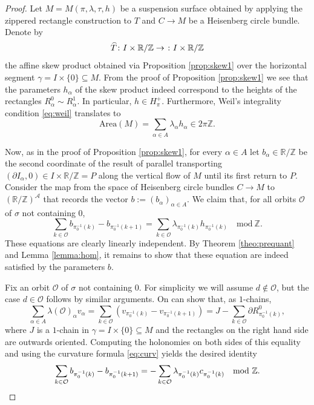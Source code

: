 \documentclass{amsart}
\theoremstyle{definition}
\theoremstyle{remark}
\numberwithin{equation}{section}
\newcommand{\<}{{\langle}}
\renewcommand{\>}{{\rangle}}
\begin{document}
\begin{proof}
    Let $M = M(\pi,\lambda,\tau,h)$ be a suspension surface obtained by applying the zippered rectangle construction to $T$ and $C \to M$ be a Heisenberg circle bundle. Denote by $$\smash{\widehat{T}} \colon I \times \mathbb{R}/\mathbb{Z} \to \mathbb \colon I \times \mathbb{R}/\mathbb{Z}$$ the affine skew product obtained via Proposition \ref{prop:skew1} over the horizontal segment $\gamma = I \times \{0\} \subseteq M$. From the proof of Proposition \ref{prop:skew1} we see that the parameters $h_\alpha$ of the skew product indeed correspond to the heights of the rectangles $R_\alpha^0 \sim R_\alpha^1$. In particular, $h \in H_\pi^+$. Furthermore, Weil's integrality condition \eqref{eq:weil} translates to
    \[
    \mathrm{Area}(M) = \sum_{\alpha \in A} \lambda_\alpha h_\alpha \in 2\pi\mathbb{Z}.
    \]

    Now, as in the proof of Proposition \ref{prop:skew1}, for every $\alpha \in A$ let $b_\alpha \in \mathbb{R}/\mathbb{Z}$ be the second coordinate of the result of parallel transporting $(\partial I_\alpha,0) \in I \times \mathbb{R}/\mathbb{Z} = P$ along the vertical flow of $M$ until its first return to $P$. Consider the map from the space of Heisenberg circle bundles $C \to M$ to $(\mathbb{R}/\mathbb{Z})^\mathcal{A}$ that records the vector $b := (b_\alpha)_{\alpha \in A}$. We claim that, for all orbits $\mathcal{O}$ of $\sigma$ not containing $0$,
    \[
    \sum_{k \in \mathcal{O}} b_{\pi_0^{-1}(k)} - b_{\pi_0^{-1}(k+1)} = \sum_{k \in \mathcal{O}} \lambda_{\pi_0^{-1}(k)} h_{\pi_0^{-1}(k)} \quad \mathrm{mod} \ \mathbb{Z}.
    \]
    These equations are clearly linearly independent. By Theorem \ref{theo:prequant} and Lemma \ref{lemma:hom}, it remains to show that these equation are indeed satisfied by the parameters $b$.

    Fix an orbit $\mathcal{O}$ of $\sigma$ not containing $0$. For simplicity we will assume $d \notin \mathcal{O}$, but the case $d \in \mathcal{O}$ follows by similar arguments. On can show that, as $1$-chains,
    \[
    \sum_{\alpha \in A} \lambda(\mathcal{O})_\alpha v_\alpha= \sum_{k \in \mathcal{O}} \left(v_{\pi_0^{-1}(k)} - v_{\pi_0^{-1}(k+1)}\right)=J - \sum_{k \in \mathcal{O}} \partial R_{\pi_0^{-1}(k)}^0,
    \]
    where $J$ is a $1$-chain in $\gamma = I \times \{0\} \subseteq M$ and the rectangles on the right hand side are outwards oriented. Computing the holonomies on both sides of this equality and using the curvature formula \eqref{eq:curv} yields the desired identity
     \[
    \sum_{k \in \mathcal{O}} b_{\pi_0^{-1}(k)} - b_{\pi_0^{-1}(k+1)} = -\sum_{k \in \mathcal{O}} \lambda_{\pi_0^{-1}(k)} c_{\pi_0^{-1}(k)} \quad \mathrm{mod} \ \mathbb{Z}. \qedhere
    \]
\end{proof}
\end{document}
